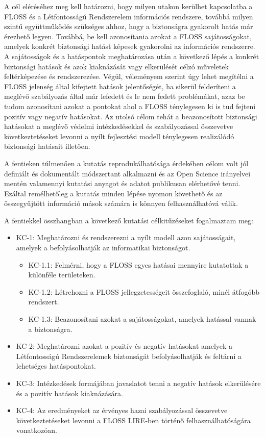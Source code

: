 \documentclass[12pt,magyar,a4paper,oneside]{scrreprt}
\providecommand{\tightlist}{%
  \setlength{\itemsep}{0pt}\setlength{\parskip}{0pt}}
\begin{document}
A cél eléréséhez meg kell határozni, hogy milyen utakon kerülhet
kapcsolatba a FLOSS és a Létfontosságú Rendszerelem információs
rendszere, továbbá milyen szintű együttműködés szükséges ahhoz, hogy a
biztonságra gyakorolt hatás már érezhető legyen. Továbbá, be kell
azonosítania azokat a FLOSS sajátosságokat, amelyek konkrét biztonsági
hatást képesek gyakorolni az információs rendszerre. A sajátosságok és a
hatáspontok meghatározása után a következő lépés a konkrét biztonsági
hatások és azok kiaknázását vagy elkerülését célzó műveletek
feltérképezése és rendszerezése. Végül, véleményem szerint úgy lehet
megítélni a FLOSS jelenség által kifejtett hatások jelentőségét, ha
sikerül felderíteni a meglévő szabályozás által már lefedett és le nem
fedett problémákat, azaz be tudom azonosítani azokat a pontokat ahol a
FLOSS ténylegesen ki is tud fejteni pozitív vagy negatív hatásokat. Az
utolsó célom tehát a beazonosított biztonsági hatásokat a meglévő
védelmi intézkedésekkel és szabályozással összevetve következtetéseket
levonni a nyílt fejlesztési modell ténylegesen realizálódó biztonsági
hatásait illetően.

A fentieken túlmenően a kutatás reprodukálhatósága érdekében célom volt
jól definiált és dokumentált módszertant alkalmazni és az Open Science
irányelvei mentén valamennyi kutatási anyagot és adatot publikusan
elérhetővé tenni. Ezáltal remélhetőleg a kutatás minden lépése nyomon
követhető és az összegyűjtött információ mások számára is könnyen
felhasználhatóvá válik.

A fentiekkel összhangban a következő kutatási célkitűzéseket fogalmaztam
meg:

\begin{itemize}
\item
  KC-1: Meghatározni és rendszerezni a nyílt modell azon sajátosságait,
  amelyek a befolyásolhatják az informatikai biztonságot.

  \begin{itemize}
  \tightlist
  \item
    KC-1.1: Felmérni, hogy a FLOSS egyes hatásai mennyire kutatottak a
    különféle területeken.
  \item
    KC-1.2: Létrehozni a FLOSS jellegzetességeit összefoglaló, minél
    átfogóbb rendszert.
  \item
    KC-1.3: Beazonosítani azokat a sajátosságokat, amelyek hatással
    vannak a biztonságra.
  \end{itemize}
\item
  KC-2: Meghatározni azokat a pozitív és negatív hatásokat amelyek a
  Létfontosságú Rendszerelemek biztonságát befolyásolhatják és feltárni
  a lehetséges hatáspontokat.
\item
  KC-3: Intézkedések formájában javaslatot tenni a negatív hatások
  elkerülésére és a pozitív hatások kiaknázására.
\item
  KC-4: Az eredményeket az érvényes hazai szabályozással összevetve
  következtetéseket levonni a FLOSS LIRE-ben történő
  felhasználhatóságára vonatkozóan.
\end{itemize}
\end{document}
